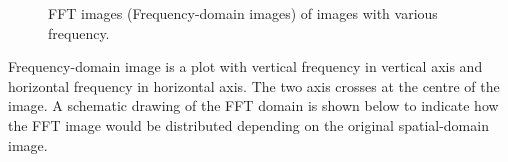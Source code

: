 \begin{figure}[htbp]
 \centering
 \caption{ FFT images (Frequency-domain images) of images with various frequency.}
 \label{fig:FFTtransformedStripesFrequencies}
\end{figure} 

Frequency-domain image is a plot with vertical frequency in vertical
axis and horizontal frequency in horizontal axis. The two axis crosses at
the centre of the image. A schematic drawing of the FFT domain is shown below to indicate how the FFT image would be distributed depending on the original spatial-domain image. 

